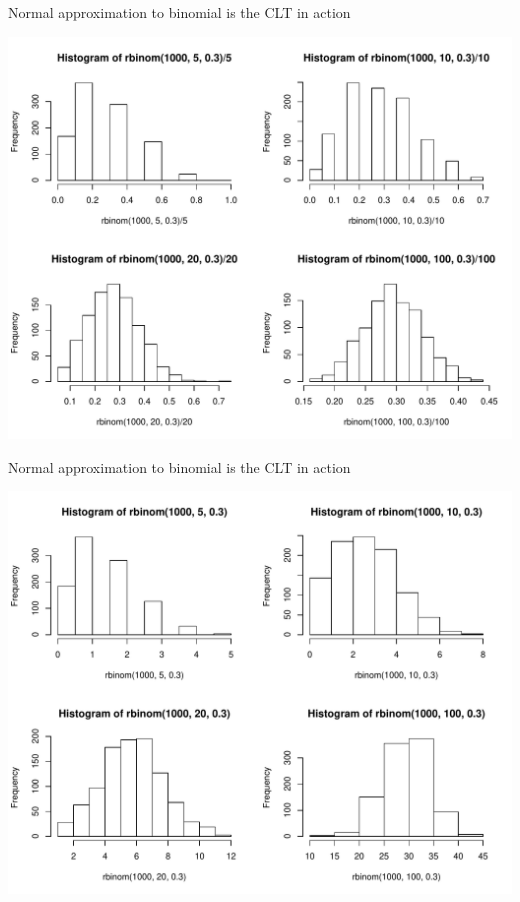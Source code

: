 \documentclass[handout]{beamer}\usepackage[]{graphicx}\usepackage[]{color}
\newenvironment{knitrout}{}{} %
\begin{document}
\begin{frame}[fragile]{Normal approximation to binomial is the CLT in action}
\begin{knitrout}\scriptsize
{}\color{fgcolor}

{\centering \includegraphics[width=1\linewidth]{figure/unnamed-chunk-4-1} 

}



\end{knitrout}
\end{frame}


\begin{frame}[fragile]{Normal approximation to binomial is the CLT in action}
\begin{knitrout}\scriptsize
{}\color{fgcolor}

{\centering \includegraphics[width=1\linewidth]{figure/unnamed-chunk-5-1} 

}



\end{knitrout}
\end{frame}
\end{document}

